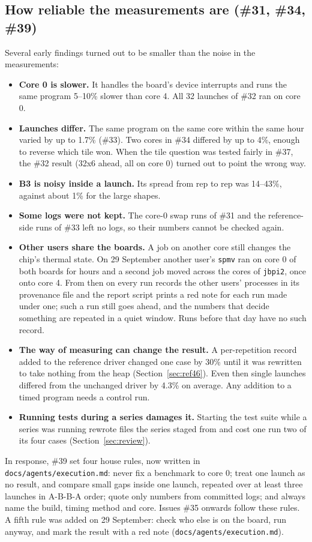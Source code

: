 \documentclass[11pt,a4paper]{article}
\begin{document}
\subsection{How reliable the measurements are (\#31, \#34, \#39)}
\label{sec:noise}
Several early findings turned out to be smaller than the noise in the measurements:
\begin{itemize}
  \item \textbf{Core 0 is slower.} It handles the board's device interrupts and runs the same program 5--10\%
  slower than core 4. All 32 launches of \#32 ran on core 0.
  \item \textbf{Launches differ.} The same program on the same core within the same hour varied by up to 1.7\%
  (\#33). Two cores in \#34 differed by up to 4\%, enough to reverse which tile won. When the tile question was
tested fairly in \#37, the \#32 result (32x6 ahead, all on core 0) turned out to point the wrong way.
  \item \textbf{B3 is noisy inside a launch.} Its spread from rep to rep was 14--43\%, against about 1\% for the
  large shapes.
  \item \textbf{Some logs were not kept.} The core-0 swap runs of \#31 and the reference-side runs of \#33 left no
  logs, so their numbers cannot be checked again.
  \item \textbf{Other users share the boards.} A job on another core still changes the chip's thermal state. On
  29 September another user's \texttt{spmv} ran on core 0 of both boards for hours and a second job moved across the cores of
  \texttt{jbpi2}, once onto core 4. From then on every run records the other users' processes in its provenance file and the report
  script prints a red note for each run made under one; such a run still goes ahead, and the numbers that decide something are repeated in a
  quiet window. Runs before that day have no such record.
  \item \textbf{The way of measuring can change the result.} A per-repetition record added to the reference driver changed one case
  by 30\% until it was rewritten to take nothing from the heap (Section~\ref{sec:ref46}). Even then single launches differed from the
  unchanged driver by 4.3\% on average. Any addition to a timed program needs a control run.
  \item \textbf{Running tests during a series damages it.} Starting the test suite while a series was running rewrote files the
  series staged from and cost one run two of its four cases (Section~\ref{sec:review}).
\end{itemize}
In response, \#39 set four house rules, now written in \texttt{docs/agents/execution.md}: never fix a benchmark
to core 0; treat one launch as no result, and compare small gaps inside one launch, repeated over at least three
launches in A-B-B-A order; quote only numbers from committed logs; and always name the build, timing method and
core. Issues \#35 onwards follow these rules. A fifth rule was added on 29 September: check who else is on the board,
run anyway, and mark the result with a red note (\texttt{docs/agents/execution.md}).
\end{document}

